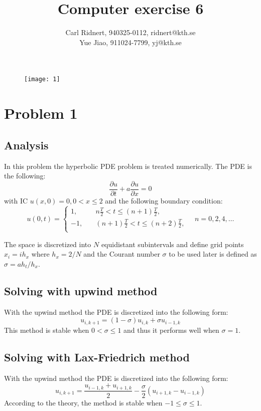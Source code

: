 \documentclass[11pt,a4paper,roman]{scrartcl}
\title{Computer exercise 6}
\date{}
\author{Carl Ridnert, 940325-0112, ridnert@kth.se \\
Yue Jiao, 911024-7799, yj@kth.se}
\begin{document}
\maketitle
\begin{figure}[h]
\centering
\texttt{[image: 1]}
\end{figure}


\newpage

\section*{Problem 1}
\subsection*{Analysis}
In this problem the hyperbolic PDE problem is treated numerically. The PDE is the following: 
\begin{equation}
\frac{\partial u}{\partial t} + a\frac{\partial u}{\partial x} = 0
\end{equation}
with IC $u(x,0)=0, 0<x\leq 2$ and the following boundary condition:
\begin{equation}
u(0,t) = \begin{cases}
1, \quad & n\frac{T}{2} < t \leq (n+1)\frac{T}{2},  \\
-1, \quad & (n+1)\frac{T}{2} < t \leq (n+2)\frac{T}{2}, \\
\end{cases} \quad n = 0,2,4,\dots
\end{equation}

The space is discretized into $N$ equidistant subintervals and define grid points $x_i = ih_x$ where $h_x = 2/N$ and the Courant number $\sigma$ to be used later is defined as $\sigma = ah_t/h_x$. 

\subsection*{Solving with upwind method}
With the upwind method the PDE is discretized into the following form:
\begin{equation}
u_{i,k+1} = (1-\sigma) u_{i,k} + \sigma u_{i-1,k}
\end{equation}
This method is stable when $0<\sigma \leq 1$ and thus it performs well when $\sigma = 1$. 

\subsection*{Solving with Lax-Friedrich method}
With the upwind method the PDE is discretized into the following form:
\begin{equation}
u_{i,k+1} = \frac{u_{i-1,k}+u_{i+1,k}}{2}- \frac{\sigma}{2}(u_{i+1,k}-u_{i-1,k})
\end{equation}
According to the theory, the method is stable when $-1\leq \sigma \leq 1$.
\end{document}

